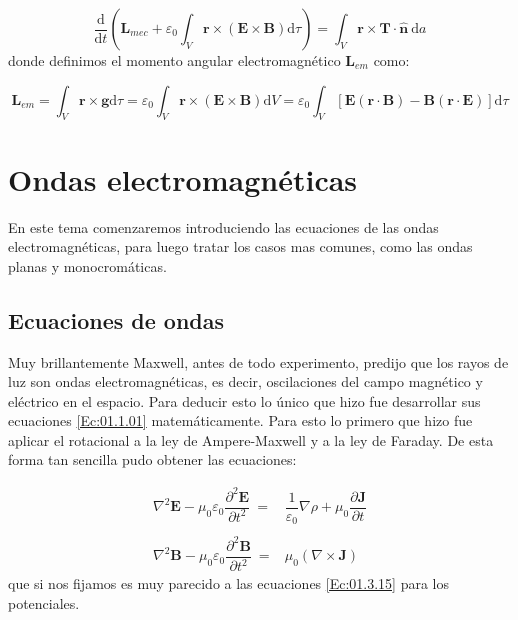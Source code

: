 \documentclass[12pt,a4paper]{article}
\newcommand{\parentesis}[1]{\left( #1  \right)}
\newcommand{\ccorchetes}[1]{\left[ #1  \right]}
\newcommand{\D}{\mathrm{d}}
\newcommand{\rota}{\nabla \times}
\newcommand{\Bn}{\mathbf{B}}
\newcommand{\En}{\mathbf{E}}
\newcommand{\Jn}{\mathbf{J}}
\newcommand{\rn}{\mathbf{r}}
\newcommand{\Ln}{\mathbf{L}}
\newcommand{\Tn}{\mathbf{T}}
\newcommand{\gn}{\mathbf{g}}
\newcommand{\hnn}{\hat{\mathbf{n}}}
\numberwithin{equation}{section}
\numberwithin{figure}{section}
\begin{document}
\begin{equation}
\dfrac{\D}{\D t} \parentesis{\Ln_{mec}+\varepsilon_0 \int_V \rn \times (\En \times \Bn) \D \tau } = \int_V \rn \times \Tn \cdot \hnn \ \D a
\end{equation}
donde definimos el momento angular electromagnético $\Ln_{em}$ como:

\begin{equation}
\Ln_{em} = \int_V \rn \times \gn \D \tau = \varepsilon_0 \int_V \rn \times (\En \times \Bn) \D V  = \varepsilon_0 \int_V \ccorchetes{\En ( \rn \cdot \Bn) - \Bn (\rn \cdot \En)} \D \tau
\end{equation}

\newpage

\section{Ondas electromagnéticas}

En este tema comenzaremos introduciendo las ecuaciones de las ondas electromagnéticas, para luego tratar los casos mas comunes, como las ondas planas y monocromáticas.



\subsection{Ecuaciones de ondas}

Muy brillantemente Maxwell, antes de todo experimento, predijo que los rayos de luz son ondas electromagnéticas, es decir, oscilaciones del campo magnético y eléctrico en el espacio. Para deducir esto lo único que hizo fue desarrollar sus ecuaciones \ref{Ec:01.1.01} matemáticamente. Para esto lo primero que hizo fue aplicar el rotacional a la ley de Ampere-Maxwell y a la ley de Faraday. De esta forma tan sencilla pudo obtener las ecuaciones:

\begin{equation}
\begin{array}{ll}
\nabla^2 \En - \mu_0 \varepsilon_0 \dfrac{\partial^2 \En}{\partial t^2} \ =  & \dfrac{1}{\varepsilon_0} \nabla \rho + \mu_0 \dfrac{\partial \Jn}{\partial t} \\ \\
\nabla^2 \Bn - \mu_0 \varepsilon_0 \dfrac{\partial^2 \Bn}{\partial t^2} \ =  & \mu_0  (\rota \Jn) 
\end{array} \label{Ec:03.1.01}
\end{equation}
que si nos fijamos es muy parecido a las ecuaciones \ref{Ec:01.3.15} para los potenciales. 
\end{document}
